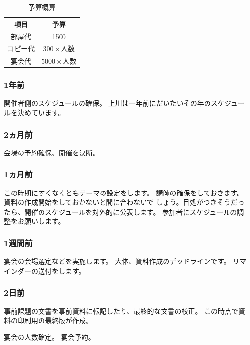 \documentclass[mingoth,a4paper]{jsarticle}
\begin{document}
\begin{table}[ht]
 \caption{予算概算}\label{tab:yosan}
 \begin{center}
  \begin{tabular}{|c|c|}
  項目 & 予算 \\
 \hline
  部屋代 & 1500 \\
  コピー代 & $ 300 \times \texttt{人数} $ \\
  宴会代 &  $ 5000 \times \texttt{人数}$ \\
  \end{tabular}
 \end{center}
\end{table}


\subsubsection{1年前}

開催者側のスケジュールの確保。
上川は一年前にだいたいその年のスケジュールを決めています。

\subsubsection{2ヵ月前}

会場の予約確保、開催を決断。

\subsubsection{1ヵ月前}

この時期にすくなくともテーマの設定をします。
講師の確保をしておきます。資料の作成開始をしておかないと間に合わないで
しょう。目処がつきそうだったら、開催のスケジュールを対外的に公表します。
参加者にスケジュールの調整をお願いします。

\subsubsection{1週間前}

宴会の会場選定などを実施します。
大体、資料作成のデッドラインです。
リマインダーの送付をします。

\subsubsection{2日前}

事前課題の文書を事前資料に転記したり、最終的な文書の校正。
この時点で資料の印刷用の最終版が作成。

宴会の人数確定。
宴会予約。
\end{document}
